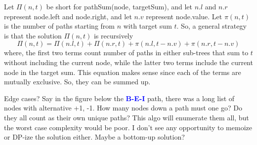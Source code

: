 \documentclass[9pt]{article}
\begin{document}
Let $\Pi(n, t)$ be short for pathSum(node, targetSum), and let $n.l$ and $n.r$
represent node.left and node.right, and let $n.v$ represent node.value. Let $\pi(n,t)$ is the number of paths starting from $n$ with target sum $t$.
So, a general strategy is that the solution $\Pi(n, t)$ is recursively
\begin{equation}
  \Pi(n, t) = \Pi(n.l, t) + \Pi(n.r, t) + \pi(n.l, t-n.v) + \pi(n.r, t-n.v)
\end{equation}
where, the first two terms count number of paths in either sub-trees that sum to
$t$ without including the current node, while the latter two terms include the
current node in the target sum. This equation makes sense since each of the terms
are mutually exclusive. So, they can be summed up.

Edge cases?
Say in the figure below the \textcolor{blue}{\textbf{B-E-I}} path, there was a long list of nodes
with alternative +1, -1. How many nodes down a path must one go? Do they all
count as their own unique paths? This algo will enumerate them all, but the
worst case complexity would be poor. I don't see any opportunity to memoize or
DP-ize the solution either. Maybe a bottom-up solution?
\end{document}
